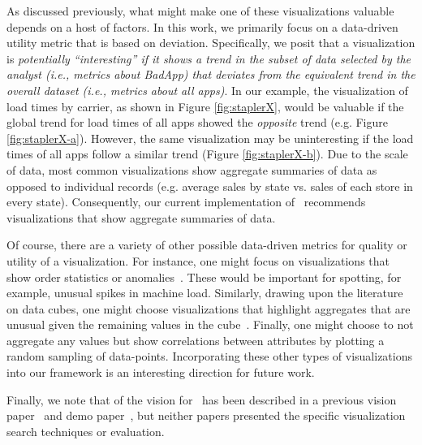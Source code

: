 \noindent As discussed previously, what might make one of these visualizations valuable depends on a host of factors.
In this work, we primarily focus on a data-driven utility metric that is based on deviation.
Specifically, we posit that a visualization is {\em potentially ``interesting'' if it shows 
a trend in the subset of data selected by the analyst
(i.e., metrics about BadApp)
that deviates from the equivalent trend in the overall dataset (i.e., metrics
about all apps)}.
In our example, the visualization of load times by carrier, as shown in Figure
\ref{fig:staplerX}, would be valuable if the global trend for load times of all
apps showed the {\it opposite} trend (e.g. Figure \ref{fig:staplerX-a}).
However, the same visualization may be uninteresting if the load times of all apps
follow a similar trend (Figure \ref{fig:staplerX-b}).
Due to the scale of data, most common visualizations show aggregate summaries of data
as opposed to individual records (e.g. average sales by state vs. sales of each store 
in every state).
Consequently, our current implementation of \SeeDB\ recommends visualizations that show aggregate 
summaries of data.

Of course, there are a variety of other possible data-driven metrics for quality or utility
of a visualization.
For instance, one might focus on visualizations that show order statistics or anomalies~\cite{DBLP:conf/avi/KandelPPHH12}. 
These would be important for spotting, for example, unusual spikes in machine load.
Similarly, drawing upon the literature on data cubes, one might choose visualizations that highlight aggregates that
are unusual given the remaining values in the cube~\cite{DBLP:conf/vldb/Sarawagi00}.
Finally, one might choose to not aggregate any values but show correlations between attributes by plotting a random
sampling of data-points.  Incorporating these other types of visualizations into our framework is an interesting
direction for future work.

Finally, we note that of the vision for \SeeDB\ has been described in a previous vision paper~\cite{DBLP:conf/vldb/Parameswaran2013} and demo paper~\cite{DBLP:journals/pvldb/VartakMPP14}, but
neither papers presented the specific visualization search techniques or evaluation.




